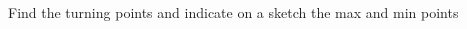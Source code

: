 \documentclass[12pt, a4paper, addpoints]{exam}
\newcommand{\ts}{\vspace{22 mm}}
\newcommand{\bs}{\vspace{44mm}}
\newcommand{\cubicwithtps}[3]{
    \pgfmathtruncatemacro{\a}{3*#1}  %
    \pgfmathtruncatemacro{\b}{6*#2}  %

    $y = 2x^3 
    \ifnum\a>0 + \a x^2 \else \a x^2 \fi 
    \ifnum\b>0 + \b x \else \b x \fi 
    \ifnum#3>0 + #3 \else #3 \fi$
}
\begin{document}
\begin{questions}
\question Find the turning points and indicate on a sketch the max and min points

\begin{multicols}{2}
\end{multicols}
\bs


\end{questions}
\end{document}

